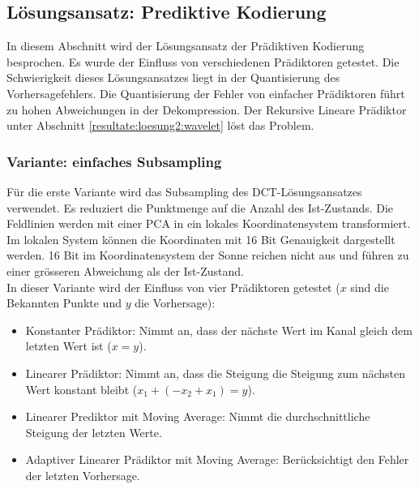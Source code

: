 \subsection{Lösungsansatz: Prediktive Kodierung}  \label{resultate:loesung2}
In diesem Abschnitt wird der Lösungsansatz der Prädiktiven Kodierung besprochen. Es wurde der Einfluss von verschiedenen Prädiktoren getestet. Die Schwierigkeit dieses Lösungsansatzes liegt in der Quantisierung des Vorhersagefehlers. Die Quantisierung der Fehler von einfacher Prädiktoren führt zu hohen Abweichungen in der Dekompression. Der Rekursive Lineare Prädiktor unter Abschnitt \ref{resultate:loesung2:wavelet} löst das Problem.

\subsubsection{Variante: einfaches Subsampling}
Für die erste Variante wird das Subsampling des DCT-Lösungsansatzes verwendet. Es reduziert die Punktmenge auf die Anzahl des Ist-Zustands. Die Feldlinien werden mit einer PCA in ein lokales Koordinatensystem transformiert. Im lokalen System können die Koordinaten mit 16 Bit Genauigkeit dargestellt werden. 16 Bit im Koordinatensystem der Sonne reichen nicht aus und führen zu einer grösseren Abweichung als der Ist-Zustand.\\
In dieser Variante wird der Einfluss von vier Prädiktoren getestet ($x$ sind die Bekannten Punkte und $y$ die Vorhersage):
\begin{itemize}
\item Konstanter Prädiktor: Nimmt an, dass der nächste Wert im Kanal gleich dem  letzten Wert ist ($x = y$).
\item Linearer Prädiktor: Nimmt an, dass die Steigung die Steigung zum nächsten Wert konstant bleibt ($x_1+(-x_2+x_1) = y$).
\item Linearer Prediktor mit Moving Average: Nimmt die durchschnittliche Steigung der letzten Werte.
\item Adaptiver Linearer Prädiktor mit Moving Average: Berücksichtigt den Fehler der letzten Vorhersage.
\end{itemize}

